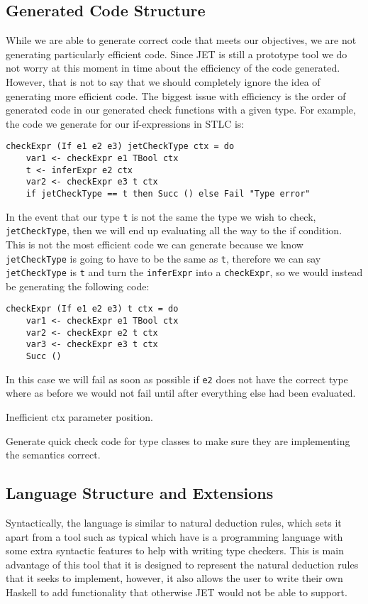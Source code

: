\subsection{Generated Code Structure}
While we are able to generate correct code that meets our objectives, we are not generating particularly efficient code.
Since JET is still a prototype tool we do not worry at this moment in time about the efficiency of the code generated.
However, that is not to say that we should completely ignore the idea of generating more efficient code.
The biggest issue with efficiency is the order of generated code in our generated check functions with a given type.
For example, the code we generate for our if-expressions in STLC is:
\begin{lstlisting}
checkExpr (If e1 e2 e3) jetCheckType ctx = do
    var1 <- checkExpr e1 TBool ctx
    t <- inferExpr e2 ctx
    var2 <- checkExpr e3 t ctx
    if jetCheckType == t then Succ () else Fail "Type error"
\end{lstlisting}
In the event that our type \texttt{t} is not the same the type we wish to check, \texttt{jetCheckType}, then we will end up evaluating all the way to the if condition.
This is not the most efficient code we can generate because we know \texttt{jetCheckType} is going to have to be the same as \texttt{t}, therefore we can say \texttt{jetCheckType} is \texttt{t} and turn the \texttt{inferExpr} into a \texttt{checkExpr}, so we would instead be generating the following code:
\begin{lstlisting}
checkExpr (If e1 e2 e3) t ctx = do
    var1 <- checkExpr e1 TBool ctx
    var2 <- checkExpr e2 t ctx
    var3 <- checkExpr e3 t ctx
    Succ ()
\end{lstlisting}
In this case we will fail as soon as possible if \texttt{e2} does not have the correct type where as before we would not fail until after everything else had been evaluated.

Inefficient ctx parameter position.

Generate quick check code for type classes to make sure they are implementing the semantics correct.

\subsection{Language Structure and Extensions}
Syntactically, the language is similar to natural deduction rules, which sets it apart from a tool such as typical\cite{grimm2007typical} which have is a programming language with some extra syntactic features to help with writing type checkers.
This is main advantage of this tool that it is designed to represent the natural deduction rules that it seeks to implement, however, it also allows the user to write their own Haskell to add functionality that otherwise JET would not be able to support.  

